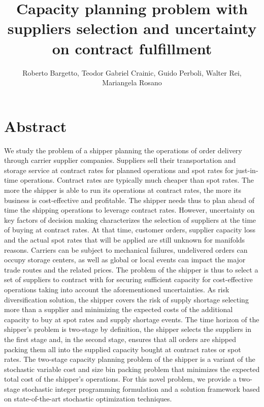 \documentclass[a4paper,11pt]{article}
\title{ \huge \bfseries Capacity planning problem with suppliers selection and uncertainty on contract fulfillment }
\author
{
	Roberto Bargetto,
	Teodor Gabriel Crainic,
	Guido Perboli,
	Walter Rei,
	Mariangela Rosano
	
}
\date{}
\begin{document}
	\maketitle
	
	\section*{Abstract}
	{
	\color{blue}
	We study the problem of a shipper planning the operations of order delivery through carrier supplier companies.
	Suppliers sell their transportation and storage service at contract rates for planned operations and spot rates for just-in-time operations.
	Contract rates are typically much cheaper than spot rates.
	The more the shipper is able to run its operations at contract rates, the more its business is cost-effective and profitable.
	The shipper needs thus to plan ahead of time the shipping operations to leverage contract rates.
	However, uncertainty on key factors of decision making characterizes the selection of suppliers at the time of buying at contract rates.
	At that time, customer orders, supplier capacity loss and the actual spot rates that will be applied are still unknown for manifolds reasons.
	Carriers can be subject to mechanical failures, undelivered orders can occupy storage centers, as well as global or local events can impact the major trade routes and the related prices.
	The problem of the shipper is thus to select a set of suppliers to contract with for securing sufficient capacity for cost-effective operations taking into account the aforementioned uncertainties.
	As risk diversification solution, the shipper covers the risk of supply shortage selecting more than a supplier and minimizing the expected costs of the additional capacity to buy at spot rates and supply shortage events.
	The time horizon of the shipper's problem is two-stage by definition, the shipper selects the suppliers in the first stage and, in the second stage, ensures that all orders are shipped packing them all into the supplied capacity bought at contract rates or spot rates.
	The two-stage capacity planning problem of the shipper is a variant of the stochastic variable cost and size bin packing problem that minimizes the expected total cost of the shipper's operations.
	For this novel problem, we provide a two-stage stochastic integer programming formulation and a solution framework based on state-of-the-art stochastic optimization techniques.
	}
	
\end{document}
